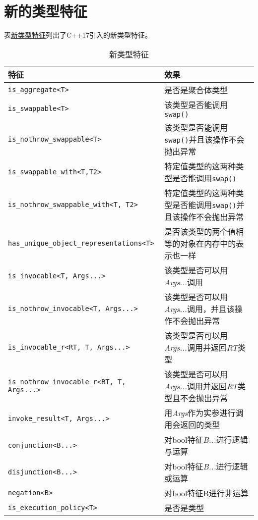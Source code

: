 \section{新的类型特征}
表\hyperref[t21.1]{新类型特征}列出了C++17引入的新类型特征。
\begin{table}[ht]
    \centering
    \begin{tabular}{l|p{}}
        \hline
        \textbf{特征}                                        & \textbf{效果}                                   \\
        \hline
        \texttt{is\_aggregate<T>}                          & 是否是聚合体类型                                      \\
        \texttt{is\_swappable<T>}                          & 该类型是否能调用\texttt{swap()}                      \\
        \texttt{is\_nothrow\_swappable<T>}                 & 该类型是否能调用\texttt{swap()}并且该操作不会抛出异常           \\
        \texttt{is\_swappable\_with<T,T2>}                 & 特定值类型的这两种类型是否能调用\texttt{swap()}              \\
        \texttt{is\_nothrow\_swappable\_with<T, T2>}       & 特定值类型的这两种类型是否能调用\texttt{swap()}并且该操作不会抛出异常   \\
        \texttt{has\_unique\_object\_representations<T>}   & 是否该类型的两个值相等的对象在内存中的表示也一样                      \\
        \texttt{is\_invocable<T, Args...>}                 & 该类型是否可以用\emph{Args...}调用                      \\
        \texttt{is\_nothrow\_invocable<T, Args...>}        & 该类型是否可以用\emph{Args...}调用，并且该操作不会抛出异常          \\
        \texttt{is\_invocable\_r<RT, T, Args...>}          & 该类型是否可以用\emph{Args...}调用并返回\emph{RT}类型        \\
        \texttt{is\_nothrow\_invocable\_r<RT, T, Args...>} & 该类型是否可以用\emph{Args...}调用并返回\emph{RT}类型且不会抛出异常 \\
        \texttt{invoke\_result<T, Args...>}                & 用\emph{Args}作为实参进行调用会返回的类型                    \\
        \texttt{conjunction<B...>}                         & 对bool特征\emph{B...}进行逻辑与运算                     \\
        \texttt{disjunction<B...>}                         & 对bool特征\emph{B...}进行逻辑或运算                     \\
        \texttt{negation<B>}                               & 对bool特征B进行非运算                                 \\
        \texttt{is\_execution\_policy<T>}                  & 是否是\nameref{ch22.2}类型                         \\
        \hline
    \end{tabular}
    \caption{新类型特征}
    \label{t21.1}
\end{table}

